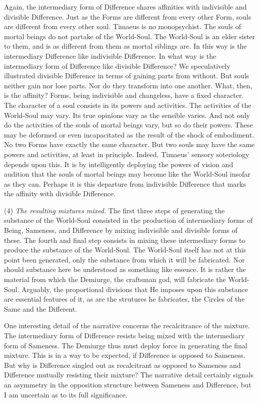 Again, the intermediary form of Difference shares affinities with indivisible and divisible Difference. Just as the Forms are different from every other Form, souls are different from every other soul. Timaeus is no monopsychist. The souls of mortal beings do not partake of the World-Soul. The World-Soul is an elder sister to them, and is as different from them as mortal siblings are. In this way is the intermediary Difference like indivisible Difference. In what way is the intermediary form of Difference like divisible Difference? We speculatively illustrated divisible Difference in terms of gaining parts from without. But souls neither gain nor lose parts. Nor do they transform into one another. What, then, is the affinity? Forms, being indivisible and changeless, have a fixed character. The character of a soul consists in its powers and activities. The activities of the World-Soul may vary. Its true opinions vary as the sensible varies. And not only do the activities of the souls of mortal beings vary, but so do their powers. These may be deformed or even incapacitated as the result of the shock of embodiment. No two Forms have exactly the same character. But two souls may have the same powers and activities, at least in principle. Indeed, Timaeus' sensory soteriology depends upon this. It is by intelligently deploying the powers of vision and audition that the souls of mortal beings may become like the World-Soul insofar as they can. Perhaps it is this departure from indivisible Difference that marks the affinity with divisible Difference.

(4) \emph{The resulting mixtures mixed.} The first three steps of generating the substance of the World-Soul consisted in the production of intermediary forms of Being, Sameness, and Difference by mixing indivisible and divisible forms of these. The fourth and final step consists in mixing these intermediary forms to produce the substance of the World-Soul. The World-Soul itself has not at this point been generated, only the substance from which it will be fabricated. Nor should substance here be understood as something like essence. It is rather the material from which the Demiurge, the craftsman god, will fabricate the World-Soul. Arguably, the proportional divisions that He imposes upon this substance are essential features of it, as are the strutures he fabricates, the Circles of the Same and the Different.

One interesting detail of the narrative concerns the recalcitrance of the mixture. The intermediary form of Difference resists being mixed with the intermediary form of Sameness. The Demiurge thus must deploy force in generating the final mixture. This is in a way to be expected, if Difference is opposed to Sameness. But why is Difference singled out as recalcitrant as opposed to Sameness and Difference mutually resisting their mixture? The narrative detail certainly signals an asymmetry in the opposition structure between Sameness and Difference, but I am uncertain as to its full significance.

